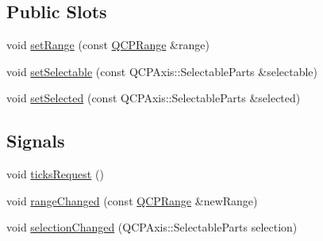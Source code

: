 \subsection*{Public Slots}
\begin{DoxyCompactItemize}
\item 
void \hyperlink{classQCPAxis_aebdfea5d44c3a0ad2b4700cd4d25b641}{set\-Range} (const \hyperlink{classQCPRange}{Q\-C\-P\-Range} \&range)
\item 
void \hyperlink{classQCPAxis_afa988209bf6519f63d6ef2e615dbe1ea}{set\-Selectable} (const Q\-C\-P\-Axis\-::\-Selectable\-Parts \&selectable)
\item 
void \hyperlink{classQCPAxis_a24c13908da2f8d629b1bbbe9cbd63e39}{set\-Selected} (const Q\-C\-P\-Axis\-::\-Selectable\-Parts \&selected)
\end{DoxyCompactItemize}
\subsection*{Signals}
\begin{DoxyCompactItemize}
\item 
void \hyperlink{classQCPAxis_af46d99613d29518795134ec4928e3873}{ticks\-Request} ()
\item 
void \hyperlink{classQCPAxis_a0894084e4c16a1736534c4095746f910}{range\-Changed} (const \hyperlink{classQCPRange}{Q\-C\-P\-Range} \&new\-Range)
\item 
void \hyperlink{classQCPAxis_aece2d803d07dba9dc2ea96fcad186e34}{selection\-Changed} (Q\-C\-P\-Axis\-::\-Selectable\-Parts selection)
\end{DoxyCompactItemize}

